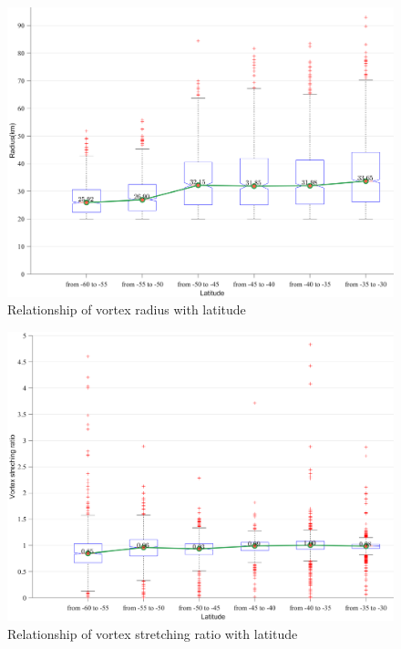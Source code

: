 \begin{figure}
    \centering
    \includegraphics[width = 15cm]{chapter/figure/radius vs latitude.png}
    \caption{Relationship of vortex radius with latitude}
    \label{radius vs latitude}
\end{figure}

\begin{figure}
    \centering
    \includegraphics[width = 15cm]{chapter/figure/enlargement vs latitude.png}
    \caption{Relationship of vortex stretching ratio with latitude}
    \label{enlargement vs latitude}
\end{figure}

